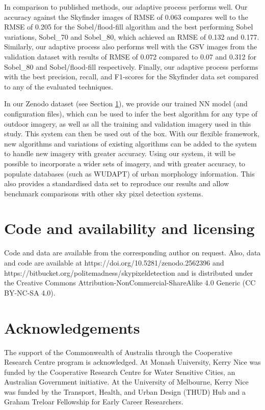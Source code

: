 \documentclass[final,3p,times,authoryear]{elsarticle}
\begin{document}
In comparison to published methods, our adaptive process performs well. Our accuracy against the Skyfinder images of RMSE of 0.063 compares well to the RMSE of 0.205 for the \cite{Middel2018} Sobel/flood-fill algorithm and the best performing \cite{Wang2015a} Sobel variations, Sobel\_70 and Sobel\_80, which achieved an RMSE of 0.132 and 0.177. Similarly, our adaptive process also performs well with the GSV images from the validation dataset with results of RMSE of 0.072 compared to 0.07 and 0.312 for Sobel\_80 and Sobel/flood-fill respectively. Finally, our adaptive process performs with the best precision, recall, and F1-scores for the Skyfinder data set compared to any of the evaluated techniques.

In our Zenodo dataset (see Section \ref{sec:available}), we provide our trained NN model (and configuration files), which can be used to infer the best algorithm for any type of outdoor imagery, as well as all the training and validation imagery used in this study. This system can then be used out of the box. With our flexible framework, new algorithms and variations of existing algorithms can be added to the system to handle new imagery with greater accuracy. Using our system, it will be possible to incorporate a wider sets of imagery, and with greater accuracy, to populate databases (such as WUDAPT) of urban morphology information. This also provides a standardised data set to reproduce our results and allow benchmark comparisons with other sky pixel detection systems.






\section{Code and availability and licensing}\label{sec:available}
Code and data are available from the corresponding author on request. Also, data and code are available at 
https://doi.org/10.5281/zenodo.2562396 and https://bitbucket.org/politemadness/skypixeldetection \citep{Nice2019SkyCode} and is distributed under the Creative Commons Attribution-NonCommercial-ShareAlike 4.0 Generic (CC BY-NC-SA 4.0). 


\section*{Acknowledgements}
The support of the Commonwealth of Australia through the Cooperative Research Centre program is acknowledged. At Monash University, Kerry Nice was funded by the Cooperative Research Centre for Water Sensitive Cities, an Australian Government initiative. At the University of Melbourne, Kerry Nice was funded by the Transport, Health, and Urban Design (THUD) Hub and a Graham Treloar Fellowship for Early Career Researchers.
 
\end{document}
